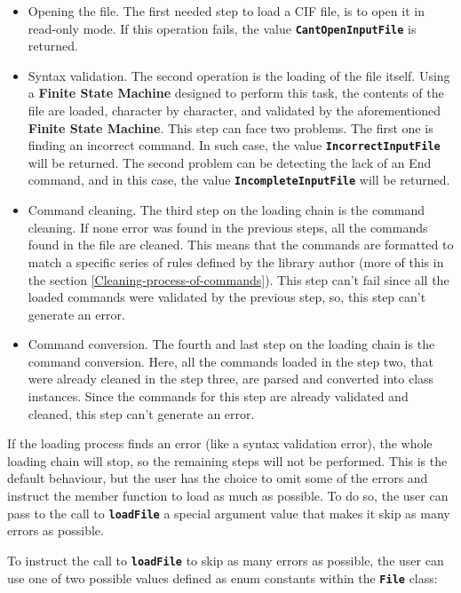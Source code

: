 \documentclass[11pt,twoside,openany,x11names,svgnames]{memoir}
\begin{document}
\begin{itemize}
	\item Opening the file. The first needed step to load a CIF file, is to open it in read-only mode. If this operation fails, the value \textbf{\texttt{CantOpenInputFile}} is returned.
	
	\item Syntax validation. The second operation is the loading of the file itself. Using a  \textbf{Finite State Machine} designed to perform this task, the contents of the file are loaded, character by character, and validated by the aforementioned \textbf{Finite State Machine}. This step can face two problems. The first one is finding an incorrect command. In such case, the value \textbf{\texttt{IncorrectInputFile}} will be returned. The second problem can be detecting the lack of an End command, and in this case, the value \textbf{\texttt{IncompleteInputFile}} will be returned.
	
	\item Command cleaning. The third step on the loading chain is the command cleaning. If none error was found in the previous steps, all the commands found in the file are cleaned. This means that the commands are formatted to match a specific series of rules defined by the library author (more of this in the section \ref{Cleaning-process-of-commands}). This step can't fail since all the loaded commands were validated by the previous step, so, this step can't generate an error.
	
	\item Command conversion. The fourth and last step on the loading chain is the command conversion. Here, all the commands loaded in the step two, that were already cleaned in the step three, are parsed and converted into class instances. Since the commands for this step are already validated and cleaned, this step can't generate an error.
\end{itemize}

If the loading process finds an error (like a syntax validation error), the whole loading chain will stop, so the remaining steps will not be performed. This is the default behaviour, but the user has the choice to omit some of the errors and instruct the member function to load as much as possible. To do so, the user can pass to the call to \textbf{\texttt{loadFile}} a special argument value that makes it skip as many errors as possible.

To instruct the call to \textbf{\texttt{loadFile}} to skip as many errors as possible, the user can use one of two possible values defined as enum constants within the \textbf{\texttt{File}} class:
\end{document}
